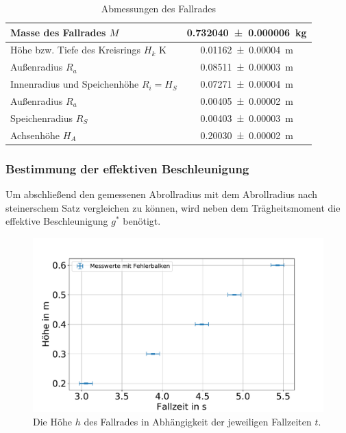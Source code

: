 \begin{table}
	\centering
	\caption{Abmessungen des Fallrades}
	\begin{tabular}{|l|c|}
	\hline 
	Masse des Fallrades $M$& \SI{0.732040\pm 0.000006}{kg} \\ 
	\hline 
	Höhe bzw. Tiefe des Kreisrings $H_k$ K& \SI{0.01162\pm 0.00004}{m} \\ 
	\hline 
	Außenradius $R_a$ & \SI{0.08511\pm 0.00003}{m} \\ 
	\hline 
	Innenradius und Speichenhöhe $R_i=H_S$ & \SI{0.07271\pm 0.00004}{m}  \\ 
	\hline 
	Außenradius $R_a$	& \SI{0.00405 \pm 0.00002}{m} \\ 
	\hline 
	Speichenradius $R_S$& \SI{0.00403 \pm 0.00003}{m} \\ 
	\hline 
	Achsenhöhe $H_A$& \SI{0.20030\pm 0.00002}{m} \\ 
	\hline 

\end{tabular}
\label{tab:datafall} 
\end{table}








\subsubsection{Bestimmung der effektiven Beschleunigung }
Um abschließend den gemessenen Abrollradius mit dem Abrollradius nach steinerschem Satz vergleichen zu können, wird neben dem Trägheitsmoment die effektive Beschleunigung $g^*$ benötigt.





\begin{figure}[h!]
	\centering
	\includegraphics[width=0.9\linewidth]{auswertung/Fallrad/h,t}
	\caption{Die Höhe $h$ des Fallrades in Abhängigkeit der jeweiligen Fallzeiten $t$.}
	\label{fig:ht}
\end{figure}



